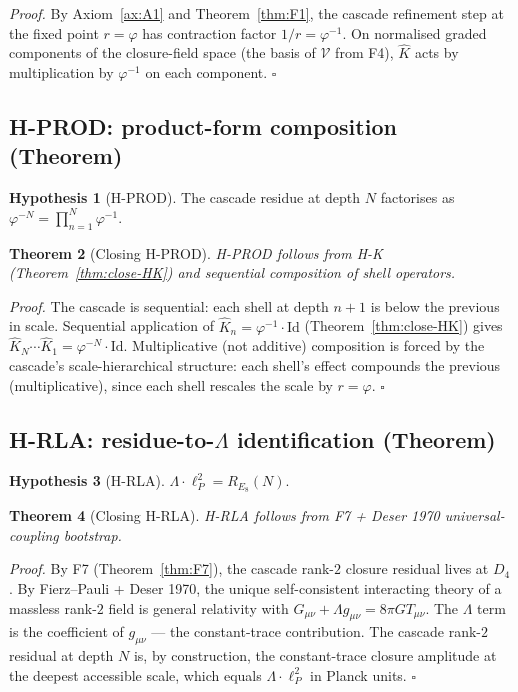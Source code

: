 \documentclass[11pt]{article}
\theoremstyle{plain}
\newtheorem{theorem}{Theorem}[section]
\theoremstyle{definition}
\newtheorem{hypothesis}[theorem]{Hypothesis}
\theoremstyle{remark}
\newcommand{\Vcal}{\mathcal{V}}
\begin{document}
\noindent\emph{Proof.}
By Axiom~\ref{ax:A1} and Theorem~\ref{thm:F1}, the cascade refinement step at the fixed point $r = \varphi$ has contraction factor $1/r = \varphi^{-1}$. On normalised graded components of the closure-field space (the basis of $\Vcal$ from F4), $\widehat K$ acts by multiplication by $\varphi^{-1}$ on each component. \hfill$\square$

\subsection{H-PROD: product-form composition (Theorem)}\label{sec:discharge-HPROD}

\begin{hypothesis}[H-PROD]
The cascade residue at depth $N$ factorises as $\varphi^{-N} = \prod_{n=1}^N \varphi^{-1}$.
\end{hypothesis}

\begin{theorem}[Closing H-PROD]\label{thm:close-HPROD}
H-PROD follows from H-K (Theorem~\ref{thm:close-HK}) and sequential composition of shell operators.
\end{theorem}

\noindent\emph{Proof.}
The cascade is sequential: each shell at depth $n+1$ is below the previous in scale. Sequential application of $\widehat K_n = \varphi^{-1} \cdot \mathrm{Id}$ (Theorem~\ref{thm:close-HK}) gives $\widehat K_N \cdots \widehat K_1 = \varphi^{-N} \cdot \mathrm{Id}$. Multiplicative (not additive) composition is forced by the cascade's scale-hierarchical structure: each shell's effect compounds the previous (multiplicative), since each shell rescales the scale by $r = \varphi$. \hfill$\square$

\subsection{H-RLA: residue-to-$\Lambda$ identification (Theorem)}\label{sec:discharge-HRLA}

\begin{hypothesis}[H-RLA]
$\Lambda \cdot \ell_P^2 = R_{E_8}(N)$.
\end{hypothesis}

\begin{theorem}[Closing H-RLA]\label{thm:close-HRLA}
H-RLA follows from F7 + Deser 1970 universal-coupling bootstrap.
\end{theorem}

\noindent\emph{Proof.}
By F7 (Theorem~\ref{thm:F7}), the cascade rank-$2$ closure residual lives at $D_4$. By Fierz--Pauli + Deser 1970, the unique self-consistent interacting theory of a massless rank-$2$ field is general relativity with $G_{\mu\nu} + \Lambda g_{\mu\nu} = 8\pi G T_{\mu\nu}$. The $\Lambda$ term is the coefficient of $g_{\mu\nu}$ --- the constant-trace contribution. The cascade rank-$2$ residual at depth $N$ is, by construction, the constant-trace closure amplitude at the deepest accessible scale, which equals $\Lambda \cdot \ell_P^2$ in Planck units. \hfill$\square$
\end{document}
